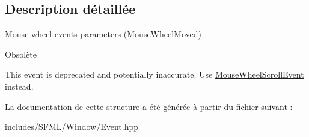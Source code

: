 \subsection{Description détaillée}
\hyperlink{classsf_1_1Mouse}{Mouse} wheel events parameters (Mouse\+Wheel\+Moved) 

\begin{DoxyRefDesc}{Obsolète}
\item[\hyperlink{deprecated__deprecated000001}{Obsolète}]This event is deprecated and potentially inaccurate. Use \hyperlink{structsf_1_1Event_1_1MouseWheelScrollEvent}{Mouse\+Wheel\+Scroll\+Event} instead.\end{DoxyRefDesc}


La documentation de cette structure a été générée à partir du fichier suivant \+:\begin{DoxyCompactItemize}
\item 
includes/\+S\+F\+M\+L/\+Window/Event.\+hpp\end{DoxyCompactItemize}
